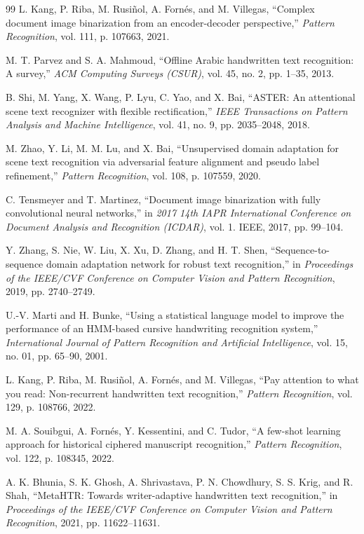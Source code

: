 \documentclass[11pt]{article}
\begin{document}
\begin{thebibliography}{99}
L. Kang, P. Riba, M. Rusi{\~n}ol, A. Forn{\'e}s, and M. Villegas, ``Complex document image binarization from an encoder-decoder perspective,'' \textit{Pattern Recognition}, vol. 111, p. 107663, 2021.

M. T. Parvez and S. A. Mahmoud, ``Offline Arabic handwritten text recognition: A survey,'' \textit{ACM Computing Surveys (CSUR)}, vol. 45, no. 2, pp. 1--35, 2013.

B. Shi, M. Yang, X. Wang, P. Lyu, C. Yao, and X. Bai, ``ASTER: An attentional scene text recognizer with flexible rectification,'' \textit{IEEE Transactions on Pattern Analysis and Machine Intelligence}, vol. 41, no. 9, pp. 2035--2048, 2018.

M. Zhao, Y. Li, M. M. Lu, and X. Bai, ``Unsupervised domain adaptation for scene text recognition via adversarial feature alignment and pseudo label refinement,'' \textit{Pattern Recognition}, vol. 108, p. 107559, 2020.

C. Tensmeyer and T. Martinez, ``Document image binarization with fully convolutional neural networks,'' in \textit{2017 14th IAPR International Conference on Document Analysis and Recognition (ICDAR)}, vol. 1. IEEE, 2017, pp. 99--104.

Y. Zhang, S. Nie, W. Liu, X. Xu, D. Zhang, and H. T. Shen, ``Sequence-to-sequence domain adaptation network for robust text recognition,'' in \textit{Proceedings of the IEEE/CVF Conference on Computer Vision and Pattern Recognition}, 2019, pp. 2740--2749.

U.-V. Marti and H. Bunke, ``Using a statistical language model to improve the performance of an HMM-based cursive handwriting recognition system,'' \textit{International Journal of Pattern Recognition and Artificial Intelligence}, vol. 15, no. 01, pp. 65--90, 2001.

L. Kang, P. Riba, M. Rusi{\~n}ol, A. Forn{\'e}s, and M. Villegas, ``Pay attention to what you read: Non-recurrent handwritten text recognition,'' \textit{Pattern Recognition}, vol. 129, p. 108766, 2022.

M. A. Souibgui, A. Forn{\'e}s, Y. Kessentini, and C. Tudor, ``A few-shot learning approach for historical ciphered manuscript recognition,'' \textit{Pattern Recognition}, vol. 122, p. 108345, 2022.

A. K. Bhunia, S. K. Ghosh, A. Shrivastava, P. N. Chowdhury, S. S. Krig, and R. Shah, ``MetaHTR: Towards writer-adaptive handwritten text recognition,'' in \textit{Proceedings of the IEEE/CVF Conference on Computer Vision and Pattern Recognition}, 2021, pp. 11622--11631.


\end{thebibliography}
\end{document}
